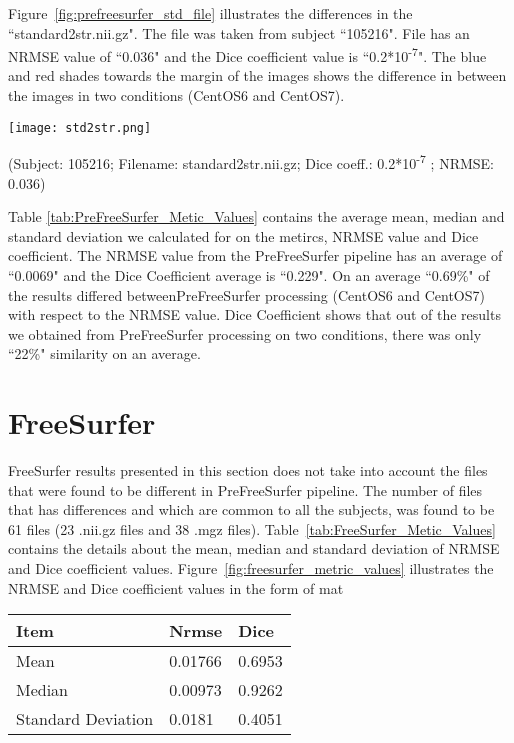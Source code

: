 Figure~\ref{fig:prefreesurfer_std_file} illustrates the differences in the ``standard2str.nii.gz". The file was taken from subject ``105216". File has an NRMSE value of ``0.036" and the Dice coefficient value is ``0.2*10\textsuperscript{-7}". The blue and red shades towards the margin of the images shows the difference in between the images in two conditions (CentOS6 and CentOS7).

\hfill \break
\begin{center}
\texttt{[image: std2str.png]}
\caption*{(Subject: 105216; Filename: standard2str.nii.gz; Dice coeff.: 0.2*10\textsuperscript{-7} ; NRMSE: 0.036)}
\label{fig:prefreesurfer_std_file}
\end{center}
\hfill \break

Table \ref{tab:PreFreeSurfer_Metic_Values} contains the average mean, median and standard deviation we calculated for on the metircs, NRMSE value and Dice coefficient. The NRMSE value from the PreFreeSurfer pipeline has an average of ``0.0069" and the Dice Coefficient average is ``0.229". On an average ``0.69\%" of the results differed betweenPreFreeSurfer processing (CentOS6 and CentOS7) with respect to the NRMSE value. Dice Coefficient shows that out of the results we obtained from PreFreeSurfer processing on two conditions, there was only ``22\%" similarity on an average. 

\section{FreeSurfer} \label{sec:Freesurfer}
FreeSurfer results presented in this section does not take into account the files that were found to be different in PreFreeSurfer pipeline. The number of files that has differences and which are common to all the subjects, was found to be 61 files (23 .nii.gz files and 38 .mgz files). Table~\ref{tab:FreeSurfer_Metic_Values} contains the details about the mean, median and standard deviation of NRMSE and Dice coefficient values. Figure~\ref{fig:freesurfer_metric_values} illustrates the NRMSE and Dice coefficient values in the form of mat
\hfill \break
\begin{center}
\begin{tabular}{|l|l|l|}
\hline
\textbf{Item}      & \textbf{Nrmse} & \textbf{Dice} \\ \hline
Mean               & 0.01766    & 0.6953  \\ \hline
Median             & 0.00973    & 0.9262   \\ \hline
Standard Deviation & 0.0181     & 0.4051   \\ \hline
\end{tabular}
\label{tab:FreeSurfer_Metic_Values}
\end{center}
\hfill \break

